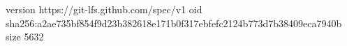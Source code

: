 version https://git-lfs.github.com/spec/v1
oid sha256:a2ae735bf854f9d23b382618e171b0f317ebfefc2124b773d7b38409eca7940b
size 5632
